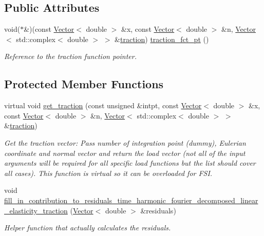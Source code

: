 \subsection*{Public Attributes}
\begin{DoxyCompactItemize}
\item 
void($\ast$\&)(const \hyperlink{classoomph_1_1Vector}{Vector}$<$ double $>$ \&x, const \hyperlink{classoomph_1_1Vector}{Vector}$<$ double $>$ \&n, \hyperlink{classoomph_1_1Vector}{Vector}$<$ std\+::complex$<$ double $>$ $>$ \&\hyperlink{classoomph_1_1TimeHarmonicFourierDecomposedLinearElasticityTractionElement_ae52e642a75d71228bc008d06c4201092}{traction}) \hyperlink{classoomph_1_1TimeHarmonicFourierDecomposedLinearElasticityTractionElement_aa2d72947cde46de0d7b5e335caa0f8b3}{traction\+\_\+fct\+\_\+pt} ()
\begin{DoxyCompactList}\small\item\em Reference to the traction function pointer. \end{DoxyCompactList}\end{DoxyCompactItemize}
\subsection*{Protected Member Functions}
\begin{DoxyCompactItemize}
\item 
virtual void \hyperlink{classoomph_1_1TimeHarmonicFourierDecomposedLinearElasticityTractionElement_a5a6e310366d2c1a02942b346d82a6c5c}{get\+\_\+traction} (const unsigned \&intpt, const \hyperlink{classoomph_1_1Vector}{Vector}$<$ double $>$ \&x, const \hyperlink{classoomph_1_1Vector}{Vector}$<$ double $>$ \&n, \hyperlink{classoomph_1_1Vector}{Vector}$<$ std\+::complex$<$ double $>$ $>$ \&\hyperlink{classoomph_1_1TimeHarmonicFourierDecomposedLinearElasticityTractionElement_ae52e642a75d71228bc008d06c4201092}{traction})
\begin{DoxyCompactList}\small\item\em Get the traction vector\+: Pass number of integration point (dummy), Eulerian coordinate and normal vector and return the load vector (not all of the input arguments will be required for all specific load functions but the list should cover all cases). This function is virtual so it can be overloaded for F\+SI. \end{DoxyCompactList}\item 
void \hyperlink{classoomph_1_1TimeHarmonicFourierDecomposedLinearElasticityTractionElement_aa9d75c3efe6b490fcdf0307378b0387f}{fill\+\_\+in\+\_\+contribution\+\_\+to\+\_\+residuals\+\_\+time\+\_\+harmonic\+\_\+fourier\+\_\+decomposed\+\_\+linear\+\_\+elasticity\+\_\+traction} (\hyperlink{classoomph_1_1Vector}{Vector}$<$ double $>$ \&residuals)
\begin{DoxyCompactList}\small\item\em Helper function that actually calculates the residuals. \end{DoxyCompactList}\end{DoxyCompactItemize}
